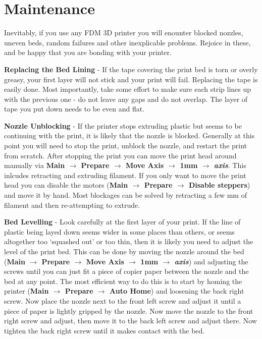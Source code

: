 \documentclass[a4paper,12pt]{article}
\begin{document}
\newpage
\thispagestyle{empty}
\footnotesize{

\section*{Maintenance}
Inevitably, if you use any FDM 3D printer you will enounter blocked nozzles, uneven beds, random failures and other inexplicable problems.
Rejoice in these, and be happy that you are bonding with your printer.

\vspace*{2mm}
\noindent \textbf{Replacing the Bed Lining} - If the tape covering the print bed is torn or overly greasy, your first layer will not stick and your print will fail. Replacing the tape is 
easily done. Most importantly, take some effort to make sure each strip lines up with the previous one - do not leave any gaps and do not overlap.
The layer of tape you put down needs to be even and flat.


\vspace*{2mm}
\noindent \textbf{Nozzle Unblocking} - If the printer stops extruding plastic but seems to be continuing with the print, it is likely that the nozzle is blocked. Generally at this point you will need to
stop the print, unblock the nozzle, and restart the print from scratch. After stopping the print you can move the print head around
manually via \textbf{Main $\rightarrow$ Prepare $\rightarrow$ Move Axis $\rightarrow$ 1mm $\rightarrow$ \textit{axis}}. This inlcudes retracting and extruding filament. If you only want to move the print head you can disable the 
motors (\textbf{Main $\rightarrow$ Prepare $\rightarrow$ Disable steppers}) and move it by hand. Most blockages
can be solved by retracting a few mm of filament and then re-attempting to extrude.

\vspace*{2mm}
\noindent \textbf{Bed Levelling} - Look carefully at the first layer of your print. If the line of plastic being layed down seems wider in some places than others, or seems altogether too `squashed out' or too thin,
then it is likely you need to adjust the level of the print bed. This can be done by moving the nozzle around the bed (\textbf{Main $\rightarrow$ Prepare $\rightarrow$ Move Axis $\rightarrow$ 1mm $\rightarrow$ \textit{axis}})
and adjusting the screws until you can just fit a piece of copier paper between the nozzle and the bed at any point. The most efficient way to do this is to start by homing the printer (\textbf{Main $\rightarrow$ Prepare $\rightarrow$ Auto Home}) and loosening the back right screw. Now place the nozzle next to the front left screw and adjust it until a piece of paper is lightly gripped by the nozzle. Now move the nozzle to the
front right screw and adjust, then move it to the back left screw and adjust there. Now tighten the back right screw until it makes contact with the bed.



}
\end{document}
